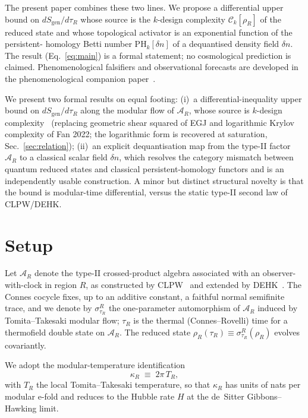 \documentclass[aps,prd,superscriptaddress,nofootinbib,floatfix,10pt]{revtex4-2}
\theoremstyle{remark}
\newcommand{\Sgen}{S_{\mathrm{gen}}}
\newcommand{\tauR}{\tau_{R}}
\newcommand{\kR}{\kappa_{R}}
\newcommand{\Ck}{\mathcal{C}_{k}}
\newcommand{\PHk}{\mathrm{PH}_{k}}
\newcommand{\dn}{\delta n}
\newcommand{\AR}{\mathcal{A}_{R}}
\begin{document}
The present paper combines these two lines. We propose a
differential upper bound on $d\Sgen/d\tauR$ whose source is the
$k$-design complexity $\Ck[\rho_{R}]$ of the reduced state and whose
topological activator is an exponential function of the persistent-
homology Betti number $\PHk[\dn]$ of a dequantised density field $\dn$.
The result (Eq.~\eqref{eq:main}) is a formal statement; no
cosmological prediction is claimed. Phenomenological falsifiers and
observational forecasts are developed in the phenomenological
companion paper~\cite{Remondiere2026ECIv5}.

We present two formal results on equal footing:
(i)~a differential-inequality upper bound on $d\Sgen/d\tauR$ along the
modular flow of $\AR$, whose source is $k$-design
complexity~\cite{MaHuang2025,Haferkamp2022} (replacing geometric shear
squared of EGJ and logarithmic Krylov complexity of Fan 2022; the
logarithmic form is recovered at saturation, Sec.~\ref{sec:relation});
(ii)~an explicit dequantisation map from the type-II factor $\AR$ to a
classical scalar field $\dn$, which resolves the category mismatch
between quantum reduced states and classical persistent-homology
functors and is an independently usable construction. A minor but
distinct structural novelty is that the bound is modular-time
differential, versus the static type-II second law of CLPW/DEHK.

\section{Setup}
\label{sec:setup}

Let $\AR$ denote the type-II crossed-product algebra associated with an
observer-with-clock in region $R$, as constructed by
CLPW~\cite{CLPW2023} and extended by
DEHK~\cite{DEHK2025a,DEHK2025b}. The Connes cocycle fixes, up to an
additive constant, a faithful normal semifinite trace, and we denote by
$\sigma^{R}_{\tauR}$ the one-parameter automorphism of $\AR$ induced by
Tomita--Takesaki modular flow; $\tauR$ is the thermal (Connes--Rovelli)
time for a thermofield double state on $\AR$. The reduced state
$\rho_{R}(\tauR)\equiv\sigma^{R}_{\tauR}(\rho_{R})$ evolves
covariantly.

We adopt the modular-temperature identification
\begin{equation}
 \kR \;\equiv\; 2\pi\,T_{R},
 \label{eq:kappa}
\end{equation}
with $T_{R}$ the local Tomita--Takesaki temperature, so that $\kR$ has
units of nats per modular e-fold and reduces to the Hubble rate $H$ at
the de~Sitter Gibbons--Hawking limit.
\end{document}
